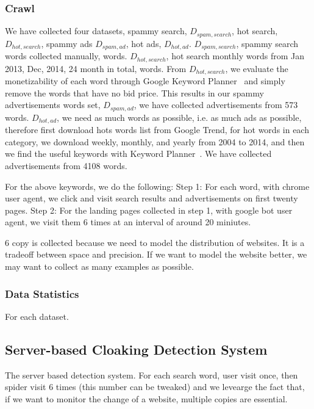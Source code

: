 \subsubsection{Crawl}

We have collected four datasets, spammy search, $D_{spam, search}$, hot search,
$D_{hot, search}$, spammy ads $D_{spam, ad}$, hot ads, $D_{hot, ad}$. 
$D_{spam, search}$, spammy search words collected manually,  words.
$D_{hot, search}$, hot search monthly words from Jan 2013, Dec, 2014, 24 month
in total,   words.
From $D_{hot, search}$, we evaluate the monetizability of each word through
Google Keyword Planner~\cite{keyword-planner} and simply
remove the words that have no bid price. This results in our spammy
advertisements words set, $D_{spam, ad}$, we have collected advertisements from 573 words.
$D_{hot, ad}$, we need as much words as possible, i.e. as much ads as possible,
therefore first download hots words list from Google Trend, for hot words in
each category, we download weekly, monthly, and yearly from 2004 to 2014, and
then we find the useful keywords with Keyword Planner~\cite{keyword-planner}.
We have collected advertisements from 4108 words.

For the above keywords, we do the following:
Step 1: For each word, with chrome user agent, we click and visit search results and advertisements on first
twenty pages.
Step 2: For the landing pages collected in step 1, with google bot user agent, we visit them 6 times at an
interval of around 20 miniutes.

6 copy is collected because we need to model the distribution of websites. It is
a tradeoff between space and precision. If we want to model the website better,
we may want to collect as many examples as possible.

\subsubsection{Data Statistics}

For each dataset.





\subsection{Server-based Cloaking Detection System}
The server based detection system.
For each search word, user visit once, then spider visit 6 times (this number
can be tweaked) and we levearge the fact that, if we want to monitor the change
of a website, multiple copies are essential.


